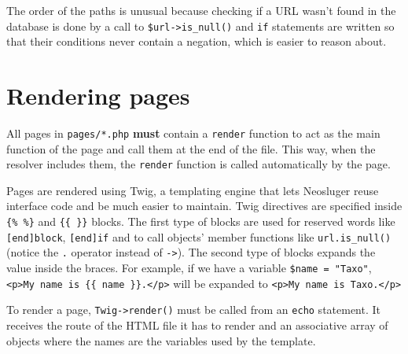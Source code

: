 The order of the paths is unusual because checking if a URL wasn't found in the database is done by a call to \texttt{\$url->is\_null()} and \texttt{if} statements are written so that their conditions never contain a negation, which is easier to reason about.

\section{Rendering pages}\label{rendering-pages}

All pages in \texttt{pages/*.php} \textbf{must} contain a \texttt{render} function to act as the main function of the page and call them at the end of the file.
This way, when the resolver includes them, the \texttt{render} function is called automatically by the page.

Pages are rendered using Twig, a templating engine that lets Neosluger reuse interface code and be much easier to maintain.
Twig directives are specified inside \texttt{\{\% \%\}} and \texttt{\{\{ \}\}} blocks.
The first type of blocks are used for reserved words like \texttt{[end]block}, \texttt{[end]if} and to call objects' member functions like \texttt{url.is\_null()} (notice the \texttt{.} operator instead of \texttt{->}).
The second type of blocks expands the value inside the braces.
For example, if we have a variable \texttt{\$name = "Taxo"}, \texttt{<p>My name is \{\{ name \}\}.</p>} will be expanded to \texttt{<p>My name is Taxo.</p>}

To render a page, \texttt{Twig->render()} must be called from an \texttt{echo} statement.
It receives the route of the HTML file it has to render and an associative array of objects where the names are the variables used by the template.
